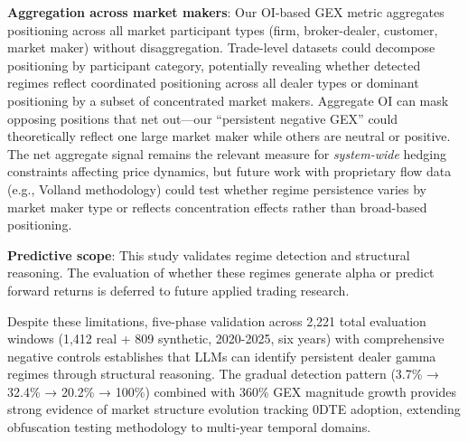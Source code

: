 \textbf{Aggregation across market makers}: Our OI-based GEX metric aggregates positioning across all market participant types (firm, broker-dealer, customer, market maker) without disaggregation. Trade-level datasets could decompose positioning by participant category, potentially revealing whether detected regimes reflect coordinated positioning across all dealer types or dominant positioning by a subset of concentrated market makers. Aggregate OI can mask opposing positions that net out---our ``persistent negative GEX'' could theoretically reflect one large market maker while others are neutral or positive. The net aggregate signal remains the relevant measure for \textit{system-wide} hedging constraints affecting price dynamics, but future work with proprietary flow data (e.g., Volland methodology) could test whether regime persistence varies by market maker type or reflects concentration effects rather than broad-based positioning.

\textbf{Predictive scope}: This study validates regime detection and structural reasoning. The evaluation of whether these regimes generate alpha or predict forward returns is deferred to future applied trading research.

Despite these limitations, five-phase validation across 2,221 total evaluation windows (1,412 real + 809 synthetic, 2020-2025, six years) with comprehensive negative controls establishes that LLMs can identify persistent dealer gamma regimes through structural reasoning. The gradual detection pattern (3.7\% → 32.4\% → 20.2\% → 100\%) combined with 360\% GEX magnitude growth provides strong evidence of market structure evolution tracking 0DTE adoption, extending obfuscation testing methodology to multi-year temporal domains.
